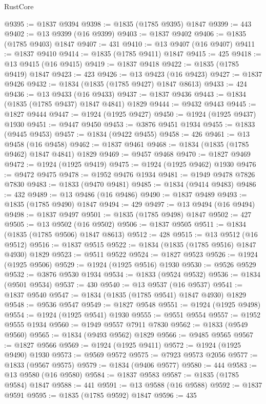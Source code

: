 \begin{lexlean}{RustCore}
\begin{coremodule}
@9395 := @1837 @9394
@9398 := @1835 (@1785 @9395) @1847
@9399 := 443
@9402 := @13 @9399 (@16 @9399)
@9403 := @1837 @9402
@9406 := @1835 (@1785 @9403) @1847
@9407 := 431
@9410 := @13 @9407 (@16 @9407)
@9411 := @1837 @9410
@9414 := @1835 (@1785 @9411) @1847
@9415 := 425
@9418 := @13 @9415 (@16 @9415)
@9419 := @1837 @9418
@9422 := @1835 (@1785 @9419) @1847
@9423 := 423
@9426 := @13 @9423 (@16 @9423)
@9427 := @1837 @9426
@9432 := @1834 (@1835 (@1785 @9427) @1847 @8613)
@9433 := 424
@9436 := @13 @9433 (@16 @9433)
@9437 := @1837 @9436
@9443 := @1834 (@1835 (@1785 @9437) @1847 @4841) @1829
@9444 := @9432 @9443
@9445 := @1827 @9444
@9447 := @1924 (@1925 @9427)
@9450 := @1924 (@1925 @9437) @1930
@9451 := @9447 @9450
@9453 := @3876 @9451 @1934
@9455 := @1833 (@9445 @9453)
@9457 := @1834 (@9422 @9455)
@9458 := 426
@9461 := @13 @9458 (@16 @9458)
@9462 := @1837 @9461
@9468 := @1834 (@1835 (@1785 @9462) @1847 @4841) @1829
@9469 := @9457 @9468
@9470 := @1827 @9469
@9472 := @1924 (@1925 @9419)
@9475 := @1924 (@1925 @9462) @1930
@9476 := @9472 @9475
@9478 := @1952 @9476 @1934
@9481 := @1949 @9478 @7826 @7830
@9483 := @1833 (@9470 @9481)
@9485 := @1834 (@9414 @9483)
@9486 := 432
@9489 := @13 @9486 (@16 @9486)
@9490 := @1837 @9489
@9493 := @1835 (@1785 @9490) @1847
@9494 := 429
@9497 := @13 @9494 (@16 @9494)
@9498 := @1837 @9497
@9501 := @1835 (@1785 @9498) @1847
@9502 := 427
@9505 := @13 @9502 (@16 @9502)
@9506 := @1837 @9505
@9511 := @1834 (@1835 (@1785 @9506) @1847 @8613)
@9512 := 428
@9515 := @13 @9512 (@16 @9512)
@9516 := @1837 @9515
@9522 := @1834 (@1835 (@1785 @9516) @1847 @4930) @1829
@9523 := @9511 @9522
@9524 := @1827 @9523
@9526 := @1924 (@1925 @9506)
@9529 := @1924 (@1925 @9516) @1930
@9530 := @9526 @9529
@9532 := @3876 @9530 @1934
@9534 := @1833 (@9524 @9532)
@9536 := @1834 (@9501 @9534)
@9537 := 430
@9540 := @13 @9537 (@16 @9537)
@9541 := @1837 @9540
@9547 := @1834 (@1835 (@1785 @9541) @1847 @4930) @1829
@9548 := @9536 @9547
@9549 := @1827 @9548
@9551 := @1924 (@1925 @9498)
@9554 := @1924 (@1925 @9541) @1930
@9555 := @9551 @9554
@9557 := @1952 @9555 @1934
@9560 := @1949 @9557 @7911 @7830
@9562 := @1833 (@9549 @9560)
@9565 := @1834 (@9493 @9562) @1829
@9566 := @9485 @9565
@9567 := @1827 @9566
@9569 := @1924 (@1925 @9411)
@9572 := @1924 (@1925 @9490) @1930
@9573 := @9569 @9572
@9575 := @7923 @9573 @2056
@9577 := @1833 (@9567 @9575)
@9579 := @1834 (@9406 @9577)
@9580 := 444
@9583 := @13 @9580 (@16 @9580)
@9584 := @1837 @9583
@9587 := @1835 (@1785 @9584) @1847
@9588 := 441
@9591 := @13 @9588 (@16 @9588)
@9592 := @1837 @9591
@9595 := @1835 (@1785 @9592) @1847
@9596 := 435

\end{coremodule}
\end{lexlean}
